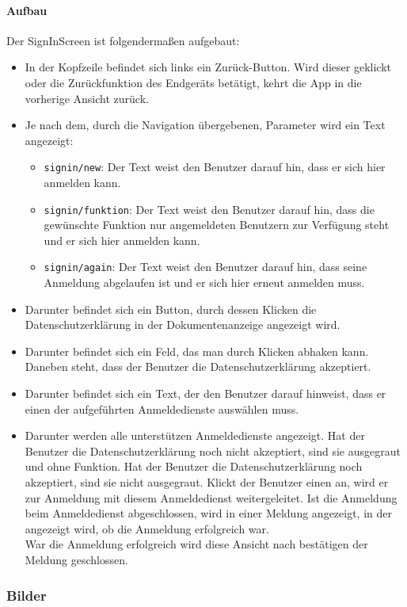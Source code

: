 \paragraph*{Aufbau}
Der SignInScreen ist folgendermaßen aufgebaut:
\begin{itemize}
    \item In der Kopfzeile befindet sich links ein Zurück-Button. Wird dieser geklickt oder die Zurückfunktion 
    des Endgeräts betätigt, kehrt die App in die vorherige Ansicht zurück.
    \item Je nach dem, durch die Navigation übergebenen, Parameter wird ein Text angezeigt:
    \begin{itemize}
        \item \texttt{signin/new}: Der Text weist den Benutzer darauf hin, dass er sich hier anmelden kann.
        \item \texttt{signin/funktion}: Der Text weist den Benutzer darauf hin, dass die gewünschte Funktion nur angemeldeten Benutzern zur Verfügung steht 
        und er sich hier anmelden kann.
        \item \texttt{signin/again}: Der Text weist den Benutzer darauf hin, dass seine Anmeldung abgelaufen ist und er sich hier erneut anmelden muss.
    \end{itemize}
    \item Darunter befindet sich ein Button, durch dessen Klicken die Datenschutzerklärung in der Dokumentenanzeige angezeigt wird.
    \item Darunter befindet sich ein Feld, das man durch Klicken abhaken kann. Daneben steht, dass der Benutzer die Datenschutzerklärung akzeptiert.
    \item Darunter befindet sich ein Text, der den Benutzer darauf hinweist, dass er einen der aufgeführten Anmeldedienste auswählen muss.
    \item Darunter werden alle unterstützen Anmeldedienste angezeigt. Hat der Benutzer die Datenschutzerklärung noch nicht akzeptiert, 
    sind sie ausgegraut und ohne Funktion. Hat der Benutzer die Datenschutzerklärung noch akzeptiert, sind sie nicht ausgegraut. 
    Klickt der Benutzer einen an, wird er zur Anmeldung mit diesem Anmeldedienst weitergeleitet.
    Ist die Anmeldung beim Anmeldedienst abgeschlossen, wird in einer Meldung angezeigt, in der angezeigt wird, ob die Anmeldung erfolgreich war.\\
    War die Anmeldung erfolgreich wird diese Ansicht nach bestätigen der Meldung geschlossen.
\end{itemize}

\subsubsection*{Bilder}\label{App_Signup_Klassen_SignInScreen_Bilder}
\begin{minipage}{\linewidth}
    \centering
    \begin{minipage}{.49\textwidth}
        \captionsetup[figure]{labelformat=empty}
        \captionsetup[figure]{labelformat=default}
    \end{minipage}
\end{minipage}